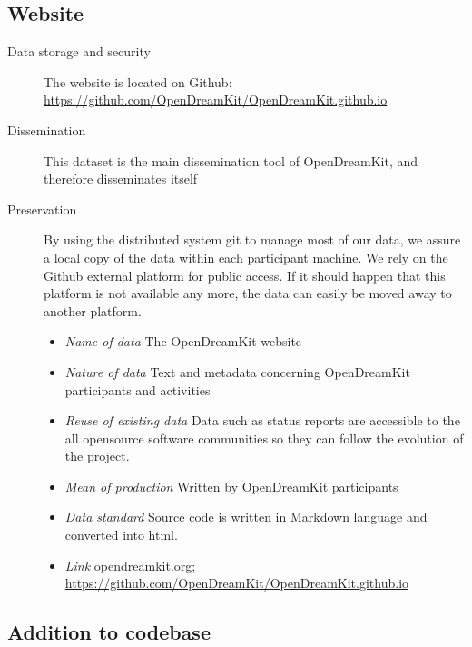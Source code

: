 \documentclass{../../Proposal/LaTeX-proposal/deliverablereport}
\begin{document}
\subsection{Website}

\begin{description}
\item[Data storage and security] The website is located on Github: \href{https://github.com/OpenDreamKit/OpenDreamKit.github.io}{https://github.com/OpenDreamKit/OpenDreamKit.github.io}
\item[Dissemination] This dataset is the main dissemination tool of OpenDreamKit, and therefore disseminates itself
\item[Preservation] By using the distributed system git to manage most of our data, we assure a local copy of the data within each participant machine. We rely on the Github external platform for public access. If it should happen that this platform is not available any more, the data can easily be moved away to another platform.
\begin{itemize}
\item\textit{Name of data} The OpenDreamKit website
\item\textit{Nature of data} Text and metadata concerning OpenDreamKit participants and activities
\item\textit{Reuse of existing data} Data such as status reports are accessible to the all opensource software communities so they can follow the evolution of the project. 
\item\textit{Mean of production} Written by OpenDreamKit participants
\item\textit{Data standard} Source code is written in Markdown language and converted into html.
\item\textit{Link} \href{http://opendreamkit.org/}{opendreamkit.org}; \href{https://github.com/OpenDreamKit/OpenDreamKit.github.io}{https://github.com/OpenDreamKit/OpenDreamKit.github.io}
\end{itemize}
\end{description}


\subsection{Addition to \GAP codebase}
\end{document}
